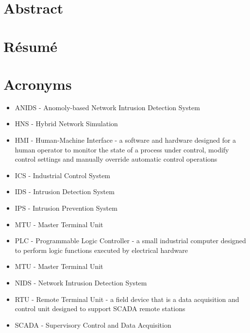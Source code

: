 \documentclass[12pt,]{article}
\begin{document}
\newpage
\mbox{} \thispagestyle{empty}

\clearpage

\section*{Abstract}\label{abstract}

\newpage
\mbox{} \thispagestyle{empty}

\clearpage

\section*{Résumé}\label{resume}

\newpage
\mbox{} \thispagestyle{empty}

\clearpage

\tableofcontents

\cleardoublepage

\listoffigures

\newpage
\mbox{} \thispagestyle{empty}

\clearpage

\section*{Acronyms}\label{acronyms}

\begin{itemize}
\itemsep1pt\parskip0pt
\item
  ANIDS - Anomoly-based Network Intrusion Detection System
\item
  HNS - Hybrid Network Simulation
\item
  HMI - Human-Machine Interface - a software and hardware designed for a
  human operator to monitor the state of a process under control, modify
  control settings and manually override automatic control operations
\item
  ICS - Industrial Control System
\item
  IDS - Intrusion Detection System
\item
  IPS - Intrusion Prevention System
\item
  MTU - Master Terminal Unit
\item
  PLC - Programmable Logic Controller - a small industrial computer
  designed to perform logic functions executed by electrical hardware
\item
  MTU - Master Terminal Unit
\item
  NIDS - Network Intrusion Detection System
\item
  RTU - Remote Terminal Unit - a field device that is a data acquisition
  and control unit designed to support SCADA remote stations
\item
  SCADA - Supervisory Control and Data Acquisition
\end{itemize}
\end{document}
